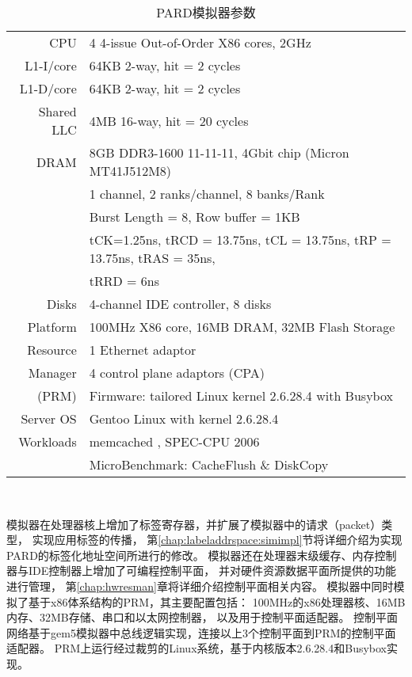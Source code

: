 \begin{table}[b]
  \centering
  \begin{minipage}[t]{0.9\linewidth}
  \caption{PARD模拟器参数}  
  \label{tab:pard-sim-setup}
    \begin{tabular*}{\linewidth}{rl}
      \toprule[1.5pt]
      CPU                  & 4 4-issue Out-of-Order X86 cores, 2GHz\\
      L1-I/core            & 64KB 2-way, hit = 2 cycles \\
      L1-D/core            & 64KB 2-way, hit = 2 cycles \\
      Shared LLC           & 4MB 16-way, hit = 20 cycles \\
      \hline
      DRAM                 & 8GB DDR3-1600 11-11-11, 4Gbit chip (Micron MT41J512M8) \\
                           & 1 channel, 2 ranks/channel, 8 banks/Rank \\
                           & Burst Length = 8, Row buffer = 1KB \\
                           & tCK=1.25ns, tRCD = 13.75ns, tCL = 13.75ns, tRP = 13.75ns, tRAS = 35ns, \\
                           & tRRD = 6ns \\
      \hline
      Disks                & 4-channel IDE controller, 8 disks \\
      \hline
      Platform             & 100MHz X86 core, 16MB DRAM, 32MB Flash Storage \\
      Resource             & 1 Ethernet adaptor  \\
      Manager              & 4 control plane adaptors (CPA) \\
      (PRM)                & Firmware: tailored Linux kernel 2.6.28.4 with Busybox \cite{busybox} \\
      \hline
      Server OS            & Gentoo Linux with kernel 2.6.28.4 \\
      \hline
      Workloads            & memcached \cite{memcached}, SPEC-CPU 2006 \cite{cpu2006} \\
                           & MicroBenchmark: CacheFlush \& DiskCopy \\
      \bottomrule[1.5pt]
    \end{tabular*}\\[2pt]
  \end{minipage}
\end{table}

模拟器在处理器核上增加了标签寄存器，并扩展了模拟器中的请求（packet）类型，
实现应用标签的传播，
第\ref{chap:labeladdrspace:simimpl}节将详细介绍为实现PARD的标签化地址空间所进行的修改。
模拟器还在处理器末级缓存、内存控制器与IDE控制器上增加了可编程控制平面，
并对硬件资源数据平面所提供的功能进行管理，
第\ref{chap:hwresman}章将详细介绍控制平面相关内容。
模拟器中同时模拟了基于x86体系结构的PRM，其主要配置包括：
100MHz的x86处理器核、16MB内存、32MB存储、串口和以太网控制器，
以及用于控制平面适配器。
控制平面网络基于gem5模拟器中总线逻辑实现，连接以上3个控制平面到PRM的控制平面适配器。
PRM上运行经过裁剪的Linux系统，基于内核版本2.6.28.4和Busybox\cite{busybox}实现。

